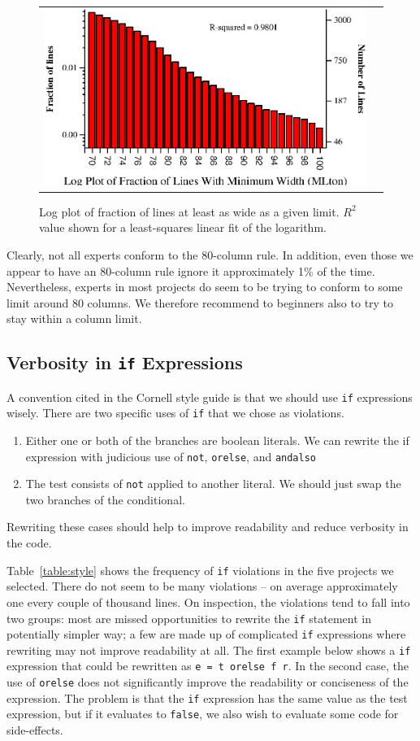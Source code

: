 \documentclass[12pt,abstracton]{scrartcl}
\begin{document}
\begin{figure}[h!]
\begin{tabular}{cc}
\includegraphics[scale=0.68]{log-mlton.eps} &
\end{tabular}
\caption{Log plot of fraction of lines at least as wide as a given limit. $R^{2}$ value shown for a least-squares linear fit of the logarithm.}
\label{fig:log-width}
\end{figure}

Clearly, not all experts conform to the 80-column rule.
In addition, even those we appear to have an 80-column rule ignore it approximately 1\% of the time.
Nevertheless, experts in most projects do seem to be trying to conform to some limit around 80 columns.
We therefore recommend to beginners also to try to stay within a column limit.
\subsection{Verbosity in \texttt{if} Expressions}
A convention cited in the Cornell style guide is that we should use \texttt{if}
expressions wisely. There are two specific uses of \texttt{if} that we
chose as violations.
\begin{enumerate}
\item Either one or both of the branches are boolean literals. We can rewrite the if expression with judicious use of \texttt{not}, \texttt{orelse}, and \texttt{andalso}
\item The test consists of \texttt{not} applied to another literal. We should just swap the two branches of the conditional.
\end{enumerate}
Rewriting these cases should help to improve readability and reduce verbosity in the code.

Table~\ref{table:style} shows the frequency of \texttt{if} violations in the five projects we selected.
There do not seem to be many violations -- on average approximately one every couple of thousand lines.
On inspection, the violations tend to fall into two groups: most are
missed opportunities to rewrite the \texttt{if} statement in potentially simpler way;
a few are made up of complicated \texttt{if} expressions where rewriting may not improve readability at all.
The first example below shows a \texttt{if} expression that could be rewritten as \texttt{e = t orelse f r}.
In the second case, the use of \texttt{orelse} does not significantly improve the readability or conciseness
of the expression. The problem is that the \texttt{if} expression has the same value as the test expression,
but if it evaluates to \texttt{false}, we also wish to evaluate some code for side-effects.
\end{document}
